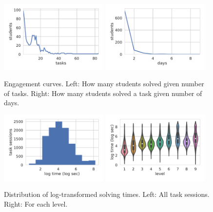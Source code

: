 \begin{figure}[htb]
\begin{center}
  \includegraphics[width=0.48\textwidth]{img/engagement-tasks}
  \includegraphics[width=0.48\textwidth]{img/engagement-days}
\end{center}
\caption{%
  Engagement curves.
  Left: How many students solved given number of tasks.
  Right: How many students solved a task given number of days.}
\label{fig:engagement-curves}
\end{figure}

\begin{figure}[htb]
\begin{center}
  \includegraphics[width=0.48\textwidth]{img/task-sessions-time-log}
  \includegraphics[width=0.48\textwidth]{img/levels-time}
\end{center}
\caption{%
  Distribution of log-transformed solving times.
  Left: All task sessions.
  Right: For each level.}
\label{fig:solving-times}
\end{figure}


